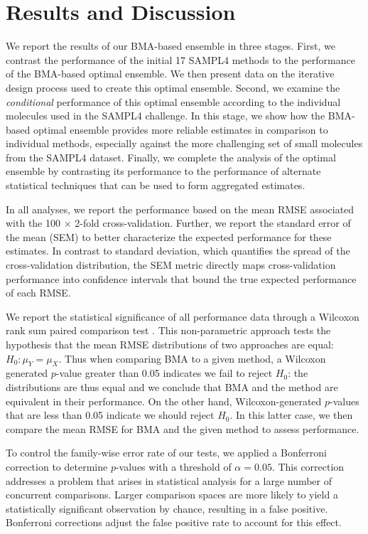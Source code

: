 \documentclass[journal=jpcbfk, manuscript=article]{achemso}
\newcommand{\+}[1]{\ensuremath{\mathbf{#1}}}
\newcommand{\rev}[1]{#1}
\begin{document}
\section{Results and Discussion} \label{Results}
We report the results of our \rev{BMA-based ensemble} in three stages.
First, we contrast the performance of the initial 17 SAMPL4 methods to the performance of the BMA-based optimal ensemble.
We then present data on the iterative design process used to create this optimal ensemble.
Second, we examine the \emph{conditional} performance of this optimal ensemble according to the individual molecules used in the SAMPL4 challenge.
In this stage, we show how the BMA-based optimal ensemble provides more reliable estimates in comparison to individual methods, especially against the more challenging set of small molecules from the SAMPL4 dataset.
Finally, we complete the analysis of the optimal ensemble by contrasting its performance to the performance of alternate statistical techniques that can be used to form aggregated estimates. 

\rev{In all analyses, we report the performance based on the mean RMSE associated with the 100 $\times$ 2-fold cross-validation. 
Further, we report the standard error of the mean (SEM) to better characterize the expected performance for these estimates. 
In contrast to standard deviation, which quantifies the spread of the cross-validation distribution, the SEM metric directly maps cross-validation performance into confidence intervals that bound the true expected performance of each RMSE.}
 
We report the statistical significance of all performance data through a Wilcoxon rank sum paired comparison test \cite{Wilcoxon:45}.
This non-parametric approach tests the hypothesis that the mean RMSE distributions of two approaches are equal: $H_0 : \mu_Y = \mu_X$.
Thus when comparing BMA to a given method, a Wilcoxon generated $p$-value greater than 0.05 indicates we fail to reject $H_0$: the distributions are thus equal and we conclude that BMA and the method are equivalent in their performance.
On the other hand, Wilcoxon-generated $p$-values that are less than 0.05 indicate we should reject $H_0$.
In this latter case, we then compare the mean RMSE for BMA and the given method to assess performance.

\rev{To control the family-wise error rate of our tests, we applied a Bonferroni correction to determine $p$-values with a threshold of $\alpha = 0.05$.
This correction addresses a problem that arises in statistical analysis for a large number of concurrent comparisons.
Larger comparison spaces are more likely to yield a statistically significant observation by chance, resulting in a false positive.
Bonferroni corrections adjust the false positive rate to account for this effect.}
\end{document}
